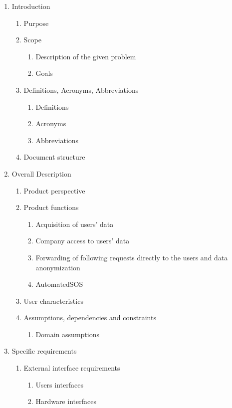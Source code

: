 \documentclass{article}
\begin{document}
	\begin{enumerate}
			\item Introduction
			\begin{enumerate}
				\item Purpose
				\item Scope
				\begin{enumerate}
					\item Description of the given problem
					\item Goals
				\end{enumerate}
				\item Definitions, Acronyms, Abbreviations
				\begin{enumerate}
					\item Definitions
					\item Acronyms
					\item Abbreviations
				\end{enumerate}
				\item Document structure
			\end{enumerate}
			\item Overall Description
			\begin{enumerate}
				\item Product perspective
				\item Product functions
				\begin{enumerate}
					\item Acquisition of users' data
					\item Company access to users' data
					\item Forwarding of following requests directly to the users and data anonymization
					\item AutomatedSOS
				\end{enumerate}
				\item User characteristics
				\item Assumptions, dependencies and constraints
				\begin{enumerate}
					\item Domain assumptions
				\end{enumerate}
			\end{enumerate}
			\item Specific requirements
			\begin{enumerate}
				\item External interface requirements	
				\begin{enumerate}
					\item Users interfaces
					\item Hardware interfaces

\end{enumerate}
\end{enumerate}
\end{enumerate}
\end{document}
